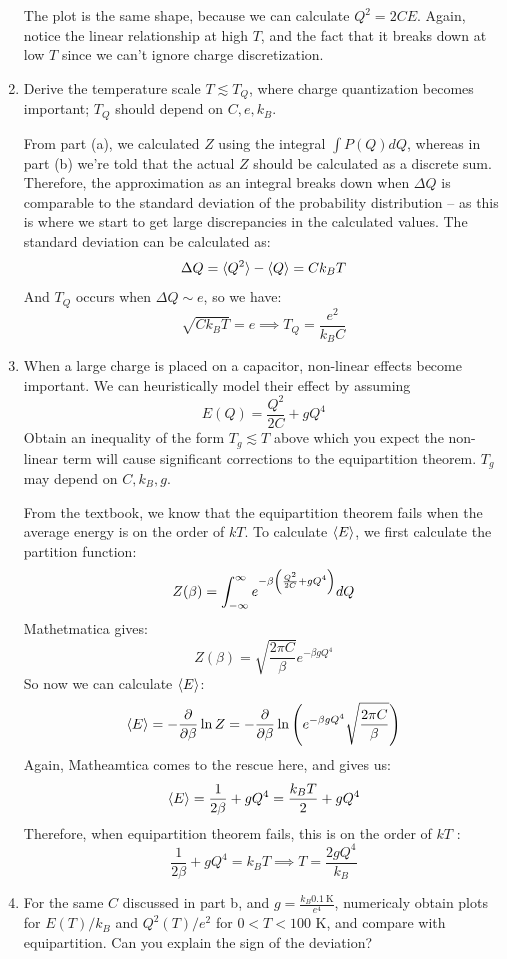 \documentclass[10pt]{article}
\begin{document}
\begin{enumerate}[label=\alph*)]
\begin{solution}
\begin{center}
				\end{center}
				The plot is the same shape, because we can calculate \(Q^2 = 2CE\). Again, notice the linear 
				relationship at high \(T\), and the fact that it breaks down at low \(T\) since we can't ignore 
				charge discretization.
			\end{solution}
		\item Derive the temperature scale $T \lesssim T_Q$, where charge quantization becomes important; \(T_Q\)
			should depend on \(C, e, k_B\).

			\begin{solution}
				From part (a), we calculated \(Z\) using the integral \(\int P(Q) dQ\), whereas in part (b) 
				we're told that the actual \(Z\) should be calculated as a discrete sum. Therefore, the 
				approximation as an integral breaks down when \(\Delta Q\) is comparable to the standard 
				deviation of the probability distribution -- as this is where we start to get large discrepancies
				in the calculated values. The standard deviation can be calculated as:
				\[
					\Delta Q = \langle Q^2 \rangle - \langle Q \rangle = C k_B T 
				\] 
				And $T_Q$ occurs when \(\Delta Q \sim e\), so we have:
				\[
				\sqrt{C k_BT}  = e \implies T_Q = \frac{e^2}{k_B C}
				\] 
			\end{solution}
		\item When a large charge is placed on a capacitor, non-linear effects become important. We can 
			heuristically model their effect by assuming 
			\[
			E(Q) = \frac{Q^2}{2C} + gQ^4
			\] 
			Obtain an inequality of the form \(T_g \lesssim T\) above which you expect the non-linear term will 
			cause significant corrections to the equipartition theorem. \(T_g\) may depend on \(C, k_B, g\).

			\begin{solution}
				From the textbook, we know that the equipartition theorem fails when the average energy 
				is on the order of \(kT\). To calculate \(\langle E \rangle\), we first calculate the partition 
				function:
				\[
				Z(\beta) = \int_{-\infty}^{\infty} e^{-\beta \left( \frac{Q^2}{2C} + gQ^4 \right) } dQ
				\] 
				Mathetmatica gives:
				\[
				Z(\beta) = \sqrt{\frac{2\pi C}{\beta}} e^{-\beta gQ^4}
				\] 
				So now we can calculate $\langle E \rangle$:
				\[
					\langle E \rangle = -\pdv{\beta} \ln Z = -\pdv{\beta} \ln \left( e^{-\beta gQ^4} \sqrt{\frac{2\pi C}{\beta}}  \right) 
				\] 
				Again, Matheamtica comes to the rescue here, and gives us:
				\[
				\langle E \rangle = \frac{1}{2\beta} + gQ^4 = \frac{k_BT}{2} + gQ^4
				\] 
				Therefore, when equipartition theorem fails, this is on the order of \(kT\) :
				\[
				\frac{1}{2\beta} + gQ^4 = k_BT \implies T = \frac{2gQ^4}{k_B}
				\] 
			\end{solution}
		\item For the same \(C\) discussed in part b, and \(g = \frac{k_B 0.1 \ \mathrm K}{e^4}\), numericaly 
			obtain plots for \(E(T) / k_B\) and \(Q^2(T) / e^2\) for \(0 < T < 100\) K, and compare with 
			equipartition. Can you explain the sign of the deviation?


\end{enumerate}
\end{document}
